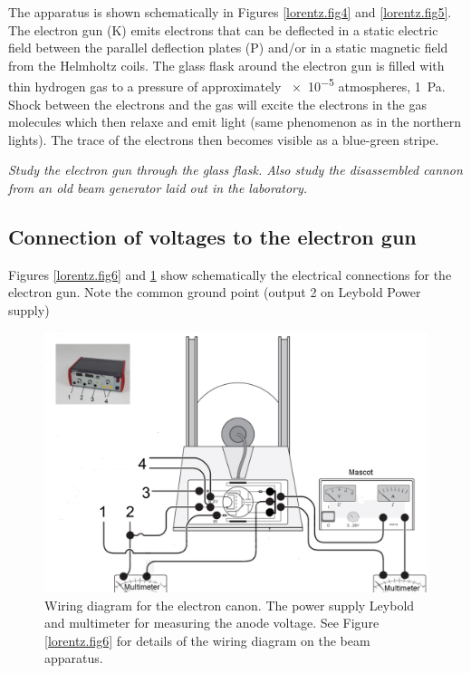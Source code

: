 \documentclass[../Elmag-labhefte-2020.tex]{subfiles}
\begin{document}
The apparatus is shown schematically in Figures \ref{lorentz.fig4} and \ref{lorentz.fig5}. The electron gun (\textsf{K}) emits electrons that can be deflected in a static electric field between the parallel deflection plates (\textsf{P}) and/or in a static magnetic field from the Helmholtz coils. The glass flask around the electron gun is filled with thin hydrogen gas to a pressure of approximately \num{e-5} atmospheres, \SI{1}{\pascal}. Shock between the electrons and the gas will excite the electrons in the gas molecules which then relaxe and emit light (same phenomenon as in the northern lights). The trace of the electrons then becomes visible as a blue-green stripe.

\emph{ Study the electron gun through the glass flask. Also study the disassembled cannon from an old beam generator laid out in the laboratory.}
\newpage
\subsection{Connection of voltages to the electron gun}

Figures \ref{lorentz.fig6} and \ref{lorentz.fig7} show schematically the electrical connections for the electron gun. Note the common ground point (output 2 on Leybold Power supply)

\begin{figure}[ht]
    \centering
    \includegraphics[width=\textwidth]{fig/Lorentz03-New.pdf}
    \caption{%
        Wiring diagram for the electron canon.
        The power supply Leybold and multimeter for measuring the anode voltage.
        See Figure \ref{lorentz.fig6} for details of the wiring diagram on the beam apparatus.
    }
    \label{lorentz.fig7}
\end{figure}
\end{document}
